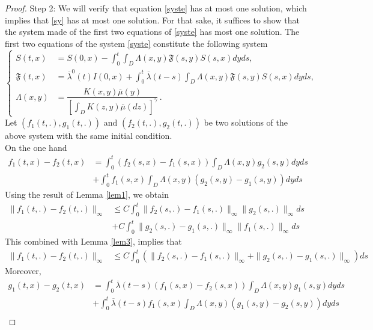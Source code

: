 \documentclass[notitlepage,reqno,11pt]{amsart}
\numberwithin{equation}{section}
\begin{document}
\begin{proof}
Step 2: We will verify that  equation \eqref{syste} has at most one solution, which implies that \eqref{sy} has at most one solution.  For that sake, it suffices to show that the system made of the first two equations of \eqref{syste}  has most one solution. The first two equations of the system \eqref{syste} constitute the following system
	\begin{equation}
	\label{sys}
	\left\lbrace
	\begin{aligned}
		S(t,x)&= S(0,x)- \int_0^t\int_{D} \Lambda(x,y)\mathfrak{F}(s,y)S(s,x)dyds,\\
	\mathfrak{F}(t,x) &=\overline{\lambda}^0(t)I(0,x)+\int_0^t\overline{\lambda}(t-s)\int_{D} \Lambda(x,y)\mathfrak{F}(s,y)S(s,x)dyds,\\
 \Lambda(x,y)&=\dfrac{K(x,y)\overline{\mu}(y)}{\left[\displaystyle\int_{D}K(z,y)\overline{\mu}(dz) \right]^{\gamma}}\,.
	\end{aligned}
	\right.
	\end{equation}
	Let $\left(f_1(t,.), g_1(t,.)\right)$ and $\left(f_2(t,.), g_2(t,.)\right)$ be two solutions of the above system with the same initial condition.\\
	On the one hand	
	\begin{align}
	f_1(t,x)-f_2(t,x)&= \int_0^t  \left(f_2(s,x)-f_1(s,x)\right)\int_{D}\Lambda(x,y)g_2(s,y)dyds\nonumber\\
	&+\int_0^tf_1(s,x)\int_{D}\Lambda(x,y)\left( g_2(s,y)-g_1(s,y)\right)dyds\nonumber
	\end{align}
Using the result of Lemma \ref{lem1}, we obtain
	\begin{align}
	\|f_1(t,.)-f_2(t,.)\|_{\infty}&\leq C\int_0^t \|f_2(s,.)-f_1(s,.)\|_{\infty}\|g_2(s,.)\|_{\infty}ds\nonumber\\
	&+ C\int_0^t\| g_2(s,.)-g_1(s,.)\|_{\infty} \|f_1(s,.)\|_{\infty}ds\nonumber
	\end{align}
This combined with Lemma \ref{lem3}, implies that
	\begin{align}
	\label{equa5}
	\|f_1(t,.)-f_2(t,.)\|_{\infty}&\leq C\int_0^t \left(\|f_2(s,.)-f_1(s,.)\|_{\infty}+\| g_2(s,.)-g_1(s,.)\|_{\infty}\right) ds
	\end{align}
	Moreover,
	\begin{align}
	g_1(t,x)-g_2(t,x)&=\int_0^t\overline{\lambda}(t-s) (f_1(s,x)-f_2(s,x))\int_{D}\Lambda(x,y)g_1(s,y)dyds\nonumber\\
	&+\int_0^t \overline{\lambda}(t-s)f_1(s,x)\int_{D}\Lambda(x,y) (g_1(s,y)-g_2(s,y))dyds\nonumber\\

\end{align}
\end{proof}
\end{document}
